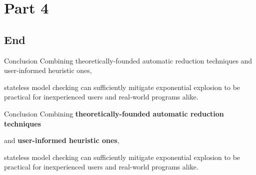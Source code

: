 \documentclass[xcolor=dvipsnames]{beamer}
\newcommand\hilight[2]{\color{#1}#2\color{black}}
\begin{document}

\section{Part 4}
\subsection{End}


\begin{frame}{Conclusion}
	Combining %
	theoretically-founded automatic reduction techniques
	and user-informed heuristic ones,
	\linegap

	stateless model checking
	\hilight{sect-quicksand}{can sufficiently mitigate exponential explosion}\xspace
	\hilight{sect-410}{to be practical for inexperienced users}\xspace
	\hilight{sect-htm}{and real-world programs alike.}\xspace
\end{frame}
\begin{frame}{Conclusion}
	Combining %
	{\bf theoretically-founded automatic reduction techniques}
	\vspace{4.82em}

	and {\bf user-informed heuristic ones},
	\vspace{4.82em}
	\linegap

	stateless model checking
	\hilight{sect-quicksand}{can sufficiently mitigate exponential explosion}\xspace
	\hilight{sect-410}{to be practical for inexperienced users}\xspace
	\hilight{sect-htm}{and real-world programs alike.}\xspace
\end{frame}
\end{document}
